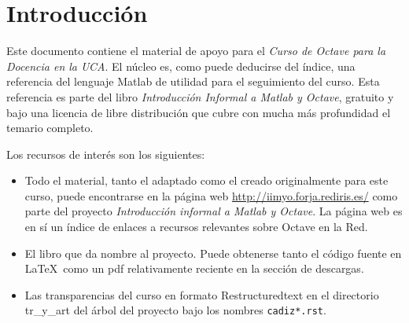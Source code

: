 \chapter{Introducción}

Este documento contiene el material de apoyo para el \emph{Curso de
  Octave para la Docencia en la UCA}. El núcleo es, como puede
deducirse del índice, una referencia del lenguaje Matlab de utilidad
para el seguimiento del curso. Esta referencia es parte del libro
\emph{Introducción Informal a Matlab y Octave}, gratuito y bajo una
licencia de libre distribución que cubre con mucha más profundidad el
temario completo.


Los recursos de interés son los siguientes:

\begin{itemize}
\item Todo el material, tanto el adaptado como el creado originalmente
  para este curso, puede encontrarse en la página web
  \url{http://iimyo.forja.rediris.es/} como parte del proyecto
  \emph{Introducción informal a Matlab y Octave}. La página web es en
  sí un índice de enlaces a recursos relevantes sobre Octave en la Red.
\item El libro que da nombre al proyecto.  Puede obtenerse tanto el
  código fuente en \LaTeX\ como un pdf relativamente reciente en la
  sección de descargas.
\item Las transparencias del curso en formato Restructuredtext en el
  directorio tr\_y\_art del árbol del proyecto bajo los nombres
  \texttt{cadiz*.rst}.
\end{itemize}
